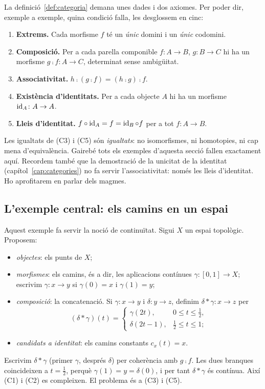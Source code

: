 La definició~\ref{def:categoria} demana unes dades i dos axiomes. Per poder dir, exemple a exemple, quina condició falla, les desglossem en cinc:
\begin{enumerate}
\item[(C1)] \textbf{Extrems.} Cada morfisme $f$ té un \emph{únic} domini i un \emph{únic} codomini.
\item[(C2)] \textbf{Composició.} Per a cada parella componible $f\colon A\to B$, $g\colon B\to C$ hi ha un morfisme $g\comp f\colon A\to C$, determinat sense ambigüitat.
\item[(C3)] \textbf{Associativitat.} $h\comp(g\comp f)=(h\comp g)\comp f$.
\item[(C4)] \textbf{Existència d'identitats.} Per a cada objecte $A$ hi ha un morfisme $\operatorname{id}_A\colon A\to A$.
\item[(C5)] \textbf{Lleis d'identitat.} $f\circ\operatorname{id}_A=f=\operatorname{id}_B\circ f$ per a tot $f\colon A\to B$.
\end{enumerate}
Les igualtats de (C3) i (C5) són \emph{igualtats}: no isomorfismes, ni homotopies, ni cap mena d'equivalència. Gairebé tots els exemples d'aquesta secció fallen exactament aquí. Recordem també que la demostració de la unicitat de la identitat (capítol~\ref{cap:categories}) no fa servir l'associativitat: només les lleis d'identitat. Ho aprofitarem en parlar dels magmes.

\subsection{L'exemple central: els camins en un espai}

Aquest exemple fa servir la noció de continuïtat. Sigui $X$ un espai topològic. Proposem:
\begin{itemize}
\item \emph{objectes}: els punts de $X$;
\item \emph{morfismes}: els camins, és a dir, les aplicacions contínues $\gamma\colon[0,1]\to X$; escrivim $\gamma\colon x\to y$ si $\gamma(0)=x$ i $\gamma(1)=y$;
\item \emph{composició}: la concatenació. Si $\gamma\colon x\to y$ i $\delta\colon y\to z$, definim $\delta\ast\gamma\colon x\to z$ per
\[
(\delta\ast\gamma)(t)=
\begin{cases}
\gamma(2t), & 0\le t\le\tfrac12,\\
\delta(2t-1), & \tfrac12\le t\le1;
\end{cases}
\]
\item \emph{candidats a identitat}: els camins constants $c_x(t)=x$.
\end{itemize}
Escrivim $\delta\ast\gamma$ (primer $\gamma$, després $\delta$) per coherència amb $g\comp f$. Les dues branques coincideixen a $t=\frac12$, perquè $\gamma(1)=y=\delta(0)$, i per tant $\delta\ast\gamma$ és contínua. Així (C1) i (C2) es compleixen. El problema és a (C3) i (C5).

